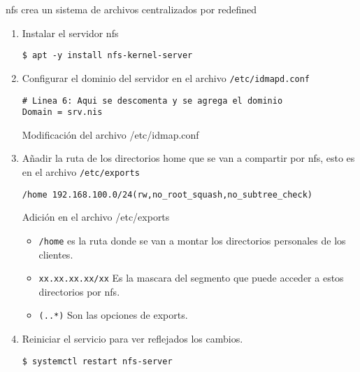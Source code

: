 \documentclass[../main.tex]{subfiles}
\begin{document}
\Gls{nfs} crea un sistema de archivos centralizados por redefined
\begin{enumerate}
  \item Instalar el servidor nfs
        \begin{listing}[H]
\begin{verbatim}
$ apt -y install nfs-kernel-server
\end{verbatim}
\end{listing}

  \item Configurar el dominio del servidor en el
        archivo \texttt{/etc/idmapd.conf}
        \begin{listing}[H]
\begin{verbatim}
# Linea 6: Aqui se descomenta y se agrega el dominio
Domain = srv.nis
\end{verbatim}
    \caption{Modificación del archivo /etc/idmap.conf}
    \label{listing:idmapd}
\end{listing}

  \item Añadir la ruta de los directorios home que se van a
        compartir por \Gls{nfs}, esto es en el archivo \texttt{/etc/exports}
        \begin{listing}[H]
\begin{verbatim}
/home 192.168.100.0/24(rw,no_root_squash,no_subtree_check) 
\end{verbatim}
    \caption{Adición en el archivo /etc/exports}
    \label{listing:exports}
\end{listing}

        \begin{itemize}
          \item \texttt{/home} es la ruta donde se van a montar
                los directorios personales de los clientes.
          \item \texttt{xx.xx.xx.xx/xx} Es la mascara del segmento que
                puede acceder a estos directorios por \Gls{nfs}.\@
          \item \texttt{(..*)} Son las opciones de exports.
        \end{itemize}


  \item Reiniciar el servicio para ver reflejados los cambios.
        \begin{listing}[H]
\begin{verbatim}
$ systemctl restart nfs-server
\end{verbatim}
\end{listing}

\end{enumerate}
\end{document}
